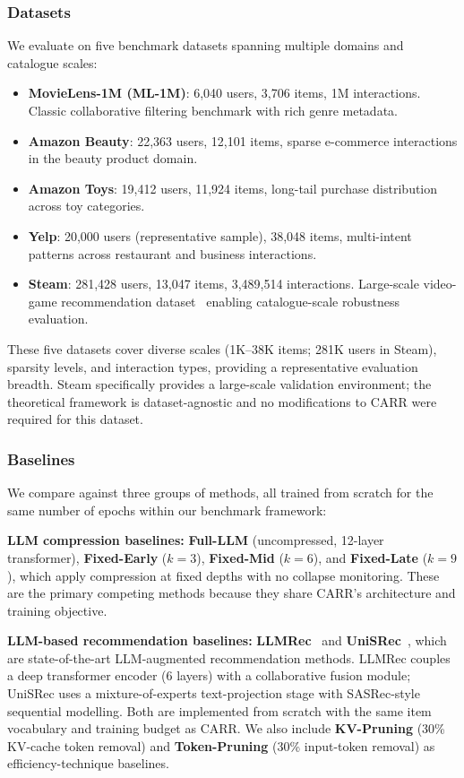 \documentclass[lettersize,journal]{IEEEtran}
\begin{document}
\subsubsection{Datasets}
We evaluate on five benchmark datasets spanning multiple domains and catalogue scales:
\begin{itemize}
    \item \textbf{MovieLens-1M (ML-1M)}: 6,040 users, 3,706 items, 1M interactions. Classic collaborative filtering benchmark with rich genre metadata.
    \item \textbf{Amazon Beauty}: 22,363 users, 12,101 items, sparse e-commerce interactions in the beauty product domain.
    \item \textbf{Amazon Toys}: 19,412 users, 11,924 items, long-tail purchase distribution across toy categories.
    \item \textbf{Yelp}: 20,000 users (representative sample), 38,048 items, multi-intent patterns across restaurant and business interactions.
    \item \textbf{Steam}: 281,428 users, 13,047 items, 3,489,514 interactions. Large-scale video-game recommendation dataset~\cite{steam2019} enabling catalogue-scale robustness evaluation.
\end{itemize}

These five datasets cover diverse scales (1K--38K items; 281K users in Steam), sparsity levels, and interaction types, providing a representative evaluation breadth. Steam specifically provides a large-scale validation environment; the theoretical framework is dataset-agnostic and no modifications to CARR were required for this dataset.

\subsubsection{Baselines}
We compare against three groups of methods, all trained from scratch for the same number of epochs within our benchmark framework:

\textbf{LLM compression baselines:} \textbf{Full-LLM} (uncompressed, 12-layer transformer), \textbf{Fixed-Early} ($k=3$), \textbf{Fixed-Mid} ($k=6$), and \textbf{Fixed-Late} ($k=9$), which apply compression at fixed depths with no collapse monitoring.  These are the primary competing methods because they share CARR's architecture and training objective.

\textbf{LLM-based recommendation baselines:} \textbf{LLMRec}~\cite{wei2024llmrec} and \textbf{UniSRec}~\cite{hou2022unisrec}, which are state-of-the-art LLM-augmented recommendation methods.  LLMRec couples a deep transformer encoder (6 layers) with a collaborative fusion module; UniSRec uses a mixture-of-experts text-projection stage with SASRec-style sequential modelling.  Both are implemented from scratch with the same item vocabulary and training budget as CARR.  We also include \textbf{KV-Pruning} (30\% KV-cache token removal) and \textbf{Token-Pruning} (30\% input-token removal) as efficiency-technique baselines.
\end{document}
